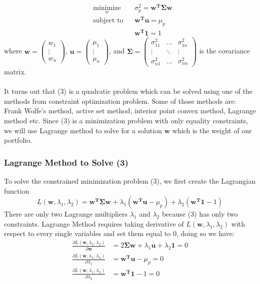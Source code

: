 \documentclass[12pt]{article}
\begin{document}
\begin{equation}
\begin{aligned}
& \underset{w}{\text{minimize}}
& &\sigma_p^2 = \mathbf{w^T\Sigma w}\\
& \text{subject to}
& & \mathbf{w^Tu} = \mu_p \\
&&& \mathbf{w^T1}=1
\end{aligned}
\end{equation}
where $\mathbf{w} = \begin{pmatrix} w_1 \\ \vdots \\ w_n \end{pmatrix}$, 
$\mathbf{u} = \begin{pmatrix} \mu_1 \\ \vdots \\ \mu_n \end{pmatrix}$, 
and $\mathbf{\Sigma} = \begin{pmatrix}\sigma_{11}^2 & \dots & \sigma_{1n}^2 \\ \vdots & \ddots & \vdots\\  \sigma_{n1}^2 & \dots & \sigma_{nn}^2 \end{pmatrix}$ is the covariance matrix.\\ \\ 
It turns out that (3) is a quadratic problem which can be solved using one of the methods from constraint optimization problem. Some of those methods are: Frank Wolfe's method, active set method, interior point convex method, Lagrange method etc. Since (3) is a minimization problem with only equality constraints, we will use Lagrange method to solve for a solution $\mathbf{w}$ which is the weight of our portfolio. 

\subsubsection{Lagrange Method to Solve (3)}

To solve the constrained minimization problem (3), we first create the Lagrangian function 
$$
L(\mathbf{w}, \lambda_1, \lambda_2) = \mathbf{w^T\Sigma w} + \lambda_1(\mathbf{w^Tu} - \mu_p) + \lambda_2(\mathbf{w^T1} - 1)
$$
There are only two Lagrange multipliers $\lambda_1$ and $\lambda_2$ because (3) has only two constraints. Lagrange Method requires taking derivative of $L(\mathbf{w}, \lambda_1, \lambda_2)$ with respect to every single variables and set them equal to 0, doing so we have: 
\begin{equation}
\begin{split}
\frac{\partial L(\mathbf{w}, \lambda_1, \lambda_2)}{\partial \mathbf{w}} &= 2\mathbf{\Sigma w} + \lambda_1\mathbf{u} + \lambda_2\mathbf{1} = 0 \\
\frac{\partial L(\mathbf{w}, \lambda_1, \lambda_2)}{\partial \lambda_1} &=  \mathbf{w^Tu} - \mu_p = 0\\
\frac{\partial L(\mathbf{w}, \lambda_1, \lambda_2)}{\partial \lambda_2} &= \mathbf{w^T1} - 1 = 0\\
\end{split}
\end{equation}
\end{document}

